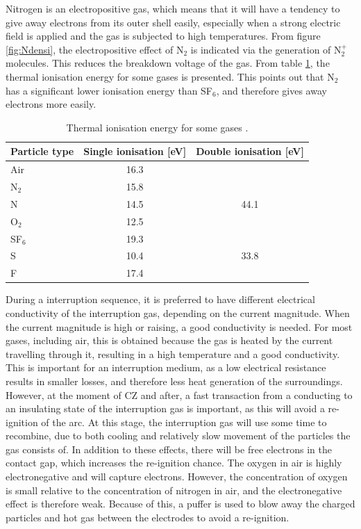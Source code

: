 \documentclass[10pt,b5paper,twoside]{article}
\begin{document}
Nitrogen is an electropositive gas, which means that it will have a tendency to give away electrons from its outer shell easily, especially when a strong electric field is applied and the gas is subjected to high temperatures. From figure \ref{fig:Ndensi}, the electropositive effect of N$_2$ is indicated via the generation of N$_{2}^{+}$ molecules. This reduces the breakdown voltage of the gas. From table \ref{tab:thermalIonisation}, the thermal ionisation energy for some gases is presented. This points out that N$_2$ has a significant lower ionisation energy than SF$_6$, and therefore gives away electrons more easily.

\begin{table}[H]
\center
\caption{Thermal ionisation energy for some gases \cite{bib:HVEbreak}.}
\begin{tabular}{|l|c|c|}
\hline 
Particle type & Single ionisation [eV] & Double ionisation [eV] \\ 
\hline 
Air & 16.3 &  \\ 
\hline 
N$_2$ & 15.8 &  \\ 
\hline 
N & 14.5 & 44.1 \\ 
\hline 
O$_2$ & 12.5 &  \\ 
\hline 
SF$_6$ & 19.3 &  \\ 
\hline 
S & 10.4 & 33.8 \\ 
\hline 
F & 17.4 &  \\ 
\hline 
\end{tabular} 
\label{tab:thermalIonisation}
\end{table}

During a interruption sequence, it is preferred to have different electrical conductivity of the interruption gas, depending on the current magnitude. When the current magnitude is high or raising, a good conductivity is needed. For most gases, including air, this is obtained because the gas is heated by the current travelling through it, resulting in a high temperature and a good conductivity. This is important for an interruption medium, as a low electrical resistance results in smaller losses, and therefore less heat generation of the surroundings. However, at the moment of CZ and after, a fast transaction from a conducting to an insulating state of the interruption gas is important, as this will avoid a re-ignition of the arc. At this stage, the interruption gas will use some time to recombine, due to both cooling and relatively slow movement of the particles the gas consists of. In addition to these effects, there will be free electrons in the contact gap, which increases the re-ignition chance. The oxygen in air is highly electronegative and will capture electrons. However, the concentration of oxygen is small relative to the concentration of nitrogen in air, and the electronegative effect is therefore weak. Because of this, a puffer is used to blow away the charged particles and hot gas between the electrodes to avoid a re-ignition.
\end{document}
